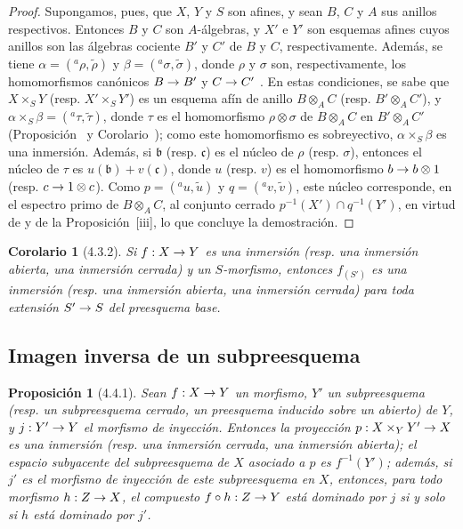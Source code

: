 \documentclass[oneside]{amsart}
\theoremstyle{ega-env-style}
\theoremstyle{ega-thm-env-style}
\newtheorem*{proposition}{Proposición}
\newtheorem*{corollary}{Corolario}
\theoremstyle{ega-defn-env-style}
\renewcommand{\to}{\mathchoice{\longrightarrow}{\rightarrow}{\rightarrow}{\rightarrow}}
\let\EGAOriginalLabel\label
\renewcommand{\label}[1]{\phantomsection\EGAOriginalLabel{#1}}
\begin{document}
\begin{proof}
Supongamos, pues, que $X$, $Y$ y $S$ son afines, y sean $B$, $C$ y $A$ sus anillos respectivos.
Entonces $B$ y $C$ son $A$-álgebras, y $X'$ e $Y'$ son esquemas afines cuyos anillos son las álgebras cociente $B'$ y $C'$ de $B$ y $C$, respectivamente.
Además, se tiene $\alpha=({}^a\rho,\widetilde{\rho})$ y $\beta=({}^a\sigma,\widetilde{\sigma})$, donde $\rho$ y $\sigma$ son, respectivamente, los homomorfismos canónicos $B\to B'$ y $C\to C'$ .
En estas condiciones, se sabe que $X\times_S Y$ (resp. $X'\times_S Y'$) es un esquema afín de anillo $B\otimes_A C$ (resp. $B'\otimes_A C'$), y $\alpha\times_S\beta=({}^a\tau,\widetilde{\tau})$, donde $\tau$ es el homomorfismo $\rho\otimes\sigma$ de $B\otimes_A C$ en $B'\otimes_A C'$ (Proposición~ y Corolario~);
como este homomorfismo es sobreyectivo, $\alpha\times_S\beta$ es una inmersión.
Además, si $\mathfrak{b}$ (resp. $\mathfrak{c}$) es el núcleo de $\rho$ (resp. $\sigma$), entonces el núcleo de $\tau$ es
$u(\mathfrak{b})+v(\mathfrak{c})$, donde $u$ (resp. $v$) es el homomorfismo $b\to b\otimes1$ (resp. $c\to1\otimes c$).
Como $p=({}^a u,\widetilde{u})$ y $q=({}^a v,\widetilde{v})$, este núcleo corresponde, en el espectro primo de $B\otimes_A C$, al conjunto cerrado $p^{-1}(X')\cap q^{-1}(Y')$, en virtud de  y de la Proposición~[iii], lo que concluye la demostración.
\end{proof}

\begin{corollary}[4.3.2]
\label{I.4.3.2}
Si $f:X\to Y$ es una inmersión (\textup{resp.} una inmersión abierta, una inmersión cerrada) y un $S$-morfismo, entonces $f_{(S')}$ es una inmersión (\textup{resp.} una inmersión abierta, una inmersión cerrada) para toda extensión $S'\to S$ del preesquema base.
\end{corollary}

\subsection{Imagen inversa de un subpreesquema}
\label{subsection:I.4.4}

\begin{proposition}[4.4.1]
\label{I.4.4.1}
Sean $f:X\to Y$ un morfismo, $Y'$ un subpreesquema (\textup{resp.} un subpreesquema cerrado, un preesquema inducido sobre un abierto) de $Y$, y $j:Y'\to Y$ el morfismo de inyección.
Entonces la proyección $p:X\times_Y Y'\to X$ es una inmersión (\textup{resp.} una inmersión cerrada, una inmersión abierta);
el espacio subyacente del subpreesquema de $X$ asociado a $p$ es $f^{-1}(Y')$;
además, si $j'$ es el morfismo de inyección de este subpreesquema en $X$, entonces, para todo morfismo $h:Z\to X$, el compuesto $f\circ h:Z\to Y$ está dominado por $j$ si y solo si $h$ está dominado por $j'$.
\end{proposition}
\end{document}
